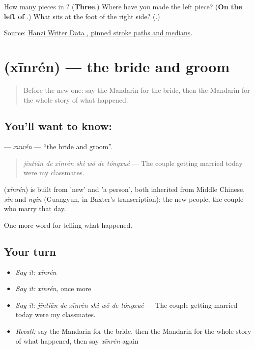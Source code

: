 \begin{tcolorbox}[breakable,colback=teal!4,colframe=teal!35!black,title={Before you move on}]
How many pieces in ? (\textbf{Three}.) Where have you made the left piece? (\textbf{On the left of }.) What sits at the foot of the right side? (\textbf{}.)

Source: \href{https://raw.githubusercontent.com/chanind/hanzi-writer-data/68d10a4b21150cae5e1ebbd223eed289cf32d90c/data/\%E7\%BB\%8F.json}{Hanzi Writer Data , pinned stroke paths and medians}.
\end{tcolorbox}
\section[\texorpdfstring{\zh{新人} (xīnrén)}{新人 (xīnrén)}]{ (xīnrén) — the bride and groom}

\label{lesson:ZH-C306-xinren}



\begin{quote}
Before the new one: say the Mandarin for the bride, then the Mandarin for the whole story of what happened.
\end{quote}

\subsection*{You'll want to know: }
\textbf{} — \emph{xīnrén} — \textquotedblleft{}the bride and groom\textquotedblright{}.

\begin{quote}
\textbf{} \emph{jīntiān de xīnrén shì wǒ de tóngxué} — The couple getting married today were my classmates.
\end{quote}

\begin{cousinweb}
\textbf{} (\emph{xīnrén}) is built from  'new' and  'a person', both inherited from Middle Chinese, \emph{sin} and \emph{nyin} (Guangyun, in Baxter's transcription): the new people, the couple who marry that day.
\end{cousinweb}

\begin{grammarlens}[title={What you've built}]
One more word for telling what happened.
\end{grammarlens}

\subsection*{Your turn}
\begin{itemize}
\raggedright
  \item \emph{Say it:} \emph{xīnrén}
  \item \emph{Say it:} \emph{xīnrén}, once more
  \item \emph{Say it:} \emph{jīntiān de xīnrén shì wǒ de tóngxué} — The couple getting married today were my classmates.
  \item \emph{Recall:} say the Mandarin for the bride, then the Mandarin for the whole story of what happened, then say \emph{xīnrén} again
\end{itemize}

